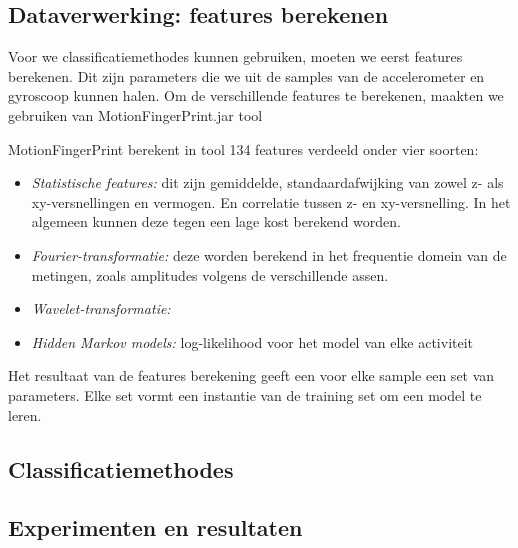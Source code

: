 \documentclass{article}
\begin{document}

\subsection{Dataverwerking: features berekenen}

Voor we classificatiemethodes kunnen gebruiken, moeten we eerst features berekenen. Dit zijn parameters die we uit de samples van de accelerometer en gyroscoop kunnen halen. Om de verschillende features te berekenen, maakten we gebruiken van MotionFingerPrint.jar tool %



MotionFingerPrint berekent in tool 134 features verdeeld onder vier soorten:
\begin{itemize}
\item \textit{Statistische features:}
 dit zijn gemiddelde, standaardafwijking van zowel z- als xy-versnellingen en vermogen. En correlatie tussen z- en xy-versnelling. In het algemeen kunnen deze tegen een lage kost berekend worden.
 
\item \textit{Fourier-transformatie:} deze worden berekend in het frequentie domein van de metingen, zoals amplitudes volgens de verschillende assen.

\item \textit{Wavelet-transformatie:} %

\item \textit{Hidden Markov models:} log-likelihood voor het model van elke activiteit
\end{itemize}

Het resultaat van de features berekening geeft een voor elke sample een set van parameters. Elke set vormt een instantie van de training set om een model te leren.

\subsection{Classificatiemethodes}


\subsection{Experimenten en resultaten}

\end{document}

